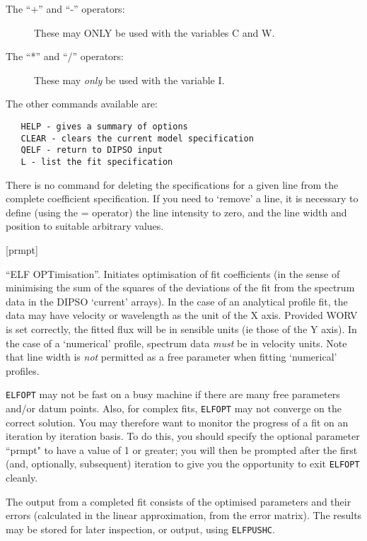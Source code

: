 \documentclass[twoside,11pt]{article}
\newcommand{\htmlref}[2]{#1}
\newcommand{\xlabel}[1]{}
\renewcommand{\_}{\texttt{\symbol{95}}}
\newcommand{\dipcom}[3] { \item [{#1}] {#2} \par }
\newcommand{\dipcom}[3] { \end{description}
                            \subsection{\xlabel{#1}{#1} - {#3}}
                            \label{COM:#1}
                            \begin{description}
                            \item [Syntax:] {\tt{#1} {#2}}
                            \par
                            \item [Description:]}
\begin{document}
\begin {description}
\begin{description}
\item [The ``+'' and ``-'' operators:]

These may ONLY be used with the variables C and W.

\item [The ``*'' and ``/'' operators:]

These may {\em only} be used with the variable I.

\end{description}

The other commands available are:

\begin{verbatim}
   HELP - gives a summary of options
   CLEAR - clears the current model specification
   QELF - return to DIPSO input
   L - list the fit specification
\end{verbatim}

There is no command for deleting the specifications for a given line
from the complete coefficient specification. If you need to `remove' a
line, it is necessary to define (using the = operator) the line
intensity to zero, and the line width and position to suitable
arbitrary values.

\dipcom{ELFOPT}{[prmpt]}{Fits a set of emission lines}
``ELF OPTimisation''. Initiates optimisation of fit coefficients (in
the sense of minimising the sum of the squares of the deviations of
the fit from the spectrum data in the DIPSO `current' arrays). In the
case of an analytical profile fit, the data may have velocity or
wavelength as the unit of the X axis. Provided WORV is set correctly,
the fitted flux will be in sensible units (ie those of the Y axis). In
the case of a `numerical' profile, spectrum data {\em must} be in
velocity units. Note that line width is {\em not} permitted as a free
parameter when fitting `numerical' profiles.

\htmlref{{\tt{ELFOPT}}}{COM:ELFOPT}  may not be fast on a busy machine if there are many free
parameters and/or datum points. Also, for complex fits, \htmlref{{\tt{ELFOPT}}}{COM:ELFOPT}  may not
converge on the correct solution. You may therefore want to monitor
the progress of a fit on an iteration by iteration basis. To do this,
you should specify the optional parameter ``prmpt" to have a value of
1 or greater; you will then be prompted after the first (and,
optionally, subsequent) iteration to give you the opportunity to exit
\htmlref{{\tt{ELFOPT}}}{COM:ELFOPT}  cleanly.

The output from a completed fit consists of the optimised parameters
and their errors (calculated in the linear approximation, from the
error matrix). The results may be stored for later inspection, or
output, using \htmlref{{\tt{ELFPUSHC}}}{COM:ELFPUSHC}. 


\end{description}
\end{document}
